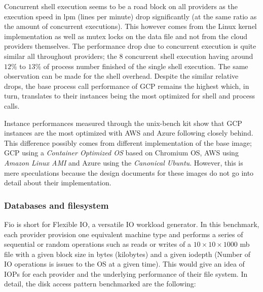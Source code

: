 \documentclass[11pt]{article}
\begin{document}
Concurrent shell execution seems to be a road block on all providers as the execution speed in lpm (lines per minute) drop significantly (at the same ratio as the amount of concurrent executions). This however comes from the Linux kernel implementation as well as mutex locks on the data file and not from the cloud providers themselves. The performance drop due to concurrent execution is quite similar all throughout providers; the 8 concurrent shell execution having around $12\%$ to $13\%$ of process number finished of the single shell execution. The same observation can be made for the shell overhead. Despite the similar relative drops, the base process call performance of GCP remains the highest which, in turn, translates to their instances being the most optimized for shell and process calls.


\vspace{-5mm}\hspace{5mm} Instance performances measured through the unix-bench kit show that GCP instances are the most optimized with AWS and Azure following closely behind. This difference possibly comes from different implementation of the base image; GCP using a \textit{Container Optimized OS} based on Chromium OS, AWS using \textit{Amazon Linux AMI} and Azure using the \textit{Canonical Ubuntu}. However, this is mere speculations because the design documents for these images do not go into detail about their implementation.

\subsubsection{Databases and filesystem}


\vspace{-5mm}\hspace{5mm} Fio is short for Flexible IO, a versatile IO workload generator. In this benchmark, each provider provision one equivalent machine type and performs a series of sequential or random operations such as reads or writes of a $10 \times 10 \times 1000$ mb file with a given block size in bytes (kilobytes) and a given iodepth (Number of IO operations is issues to the OS at a given time). This would give an idea of IOPs for each provider and the underlying performance of their file system. In detail, the disk access pattern benchmarked are the following:
\end{document}
